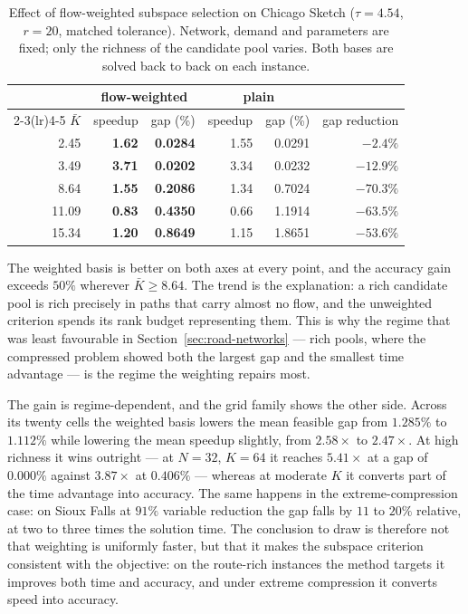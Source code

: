\documentclass[11pt]{article}
\begin{document}
\begin{table}[h]
\centering
\caption{Effect of flow-weighted subspace selection on Chicago Sketch ($\tau=4.54$, $r=20$,
matched tolerance). Network, demand and parameters are fixed; only the richness of the
candidate pool varies. Both bases are solved back to back on each instance.}
\label{tab:weighted-basis}
{\small
\begin{tabular}{rrrrrr}
\toprule
& \multicolumn{2}{c}{flow-weighted} & \multicolumn{2}{c}{plain} & \\
\cmidrule(lr){2-3}\cmidrule(lr){4-5}
$\bar K$ & speedup & gap (\%) & speedup & gap (\%) & gap reduction\\
\midrule
2.45  & \textbf{1.62} & \textbf{0.0284} & 1.55 & 0.0291 & $-2.4\%$\\
3.49  & \textbf{3.71} & \textbf{0.0202} & 3.34 & 0.0232 & $-12.9\%$\\
8.64  & \textbf{1.55} & \textbf{0.2086} & 1.34 & 0.7024 & $\mathbf{-70.3\%}$\\
11.09 & \textbf{0.83} & \textbf{0.4350} & 0.66 & 1.1914 & $\mathbf{-63.5\%}$\\
15.34 & \textbf{1.20} & \textbf{0.8649} & 1.15 & 1.8651 & $\mathbf{-53.6\%}$\\
\bottomrule
\end{tabular}}
\end{table}

The weighted basis is better on both axes at every point, and the accuracy gain exceeds $50\%$
wherever $\bar K \ge 8.64$. The trend is the explanation: a rich candidate pool is rich
precisely in paths that carry almost no flow, and the unweighted criterion spends its rank
budget representing them. This is why the regime that was least favourable in
Section~\ref{sec:road-networks} --- rich pools, where the compressed problem showed both the
largest gap and the smallest time advantage --- is the regime the weighting repairs most.

The gain is regime-dependent, and the grid family shows the other side. Across its twenty
cells the weighted basis lowers the mean feasible gap from $1.285\%$ to $1.112\%$ while
lowering the mean speedup slightly, from $2.58\times$ to $2.47\times$. At high richness it wins
outright --- at $N=32$, $K=64$ it reaches $5.41\times$ at a gap of $0.000\%$ against
$3.87\times$ at $0.406\%$ --- whereas at moderate $K$ it converts part of the time advantage
into accuracy. The same happens in the extreme-compression case: on Sioux Falls at $91\%$
variable reduction the gap falls by $11$ to $20\%$ relative, at two to three times the solution
time. The conclusion to draw is therefore not that weighting is uniformly faster, but that it
makes the subspace criterion consistent with the objective: on the route-rich instances the
method targets it improves both time and accuracy, and under extreme compression it converts
speed into accuracy.
\end{document}
